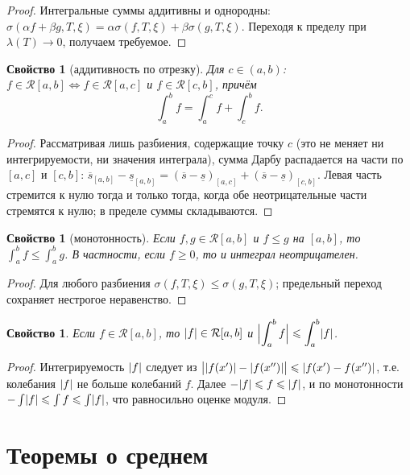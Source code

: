 \documentclass[11pt,a4paper]{article}
\theoremstyle{definition}
\theoremstyle{plain}
\newtheorem{property}[definition]{Свойство}
\renewcommand{\le}{\leqslant}
\renewcommand{\ge}{\geqslant}
\DeclarePairedDelimiter{\abs}{\lvert}{\rvert}
\begin{document}
\begin{proof}
Интегральные суммы аддитивны и однородны: $\sigma(\alpha f+\beta g,T,\xi)=\alpha\sigma(f,T,\xi)
+\beta\sigma(g,T,\xi)$. Переходя к пределу при $\lambda(T)\to0$, получаем требуемое.
\end{proof}

\begin{property}[аддитивность по отрезку]
Для $c\in(a,b)$: $f\in\mathcal R[a,b]\iff f\in\mathcal R[a,c]$ и $f\in\mathcal R[c,b]$, причём
\[
  \int_a^b f=\int_a^c f+\int_c^b f .
\]
\end{property}

\begin{proof}
Рассматривая лишь разбиения, содержащие точку $c$ (это не меняет ни интегрируемости, ни значения
интеграла), сумма Дарбу распадается на части по $[a,c]$ и $[c,b]$:
$\overline s_{[a,b]}-\underline s_{[a,b]}=(\overline s-\underline s)_{[a,c]}
+(\overline s-\underline s)_{[c,b]}$. Левая часть стремится к нулю тогда и только тогда, когда
обе неотрицательные части стремятся к нулю; в пределе суммы складываются.
\end{proof}

\begin{property}[монотонность]
Если $f,g\in\mathcal R[a,b]$ и $f\le g$ на $[a,b]$, то $\displaystyle\int_a^b f\le\int_a^b g$.
В частности, если $f\ge0$, то и интеграл неотрицателен.
\end{property}

\begin{proof}
Для любого разбиения $\sigma(f,T,\xi)\le\sigma(g,T,\xi)$; предельный переход сохраняет нестрогое
неравенство.
\end{proof}

\begin{property}
Если $f\in\mathcal R[a,b]$, то $\abs f\in\mathcal R[a,b]$ и
$\displaystyle\abs[\Big]{\int_a^b f}\le\int_a^b\abs f$.
\end{property}

\begin{proof}
Интегрируемость $\abs f$ следует из $\bigl|\abs{f(x')}-\abs{f(x'')}\bigr|\le\abs{f(x')-f(x'')}$,
т.е. колебания $\abs f$ не больше колебаний $f$. Далее $-\abs f\le f\le\abs f$, и по
монотонности $-\int\abs f\le\int f\le\int\abs f$, что равносильно оценке модуля.
\end{proof}

\section{Теоремы о среднем}
\end{document}
